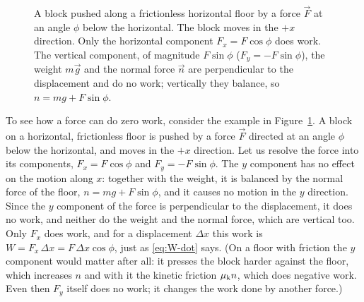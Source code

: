 \documentclass[11pt,a4paper]{article}
\begin{document}
\begin{figure}[ht]
\centering
\begin{minipage}[c]{0.46\textwidth}
\centering
{}
\end{minipage}\hfill
\begin{minipage}[c]{0.5\textwidth}
\caption{A block pushed along a frictionless horizontal floor by a force $\vec{F}$ at an angle $\phi$
below the horizontal. The block moves in the $+x$ direction. Only the horizontal component
$F_x = F\cos\phi$ does work. The vertical component, of magnitude $F\sin\phi$
($F_y = -F\sin\phi$), the weight $m\vec{g}$ and the normal force
$\vec{n}$ are perpendicular to the displacement and do no work; vertically they balance, so
$n = mg + F\sin\phi$.}\label{fig:push}
\end{minipage}
\end{figure}

To see how a force can do zero work, consider the example in Figure~\ref{fig:push}. A block on a
horizontal, frictionless floor is pushed by a force $\vec{F}$ directed at an angle $\phi$ below the
horizontal, and moves in the $+x$ direction. Let us resolve the force into its components,
$F_x = F\cos\phi$ and $F_y = -F\sin\phi$. The $y$ component has no effect on the motion along $x$:
together with the weight, it is balanced by the normal force of the floor, $n = mg + F\sin\phi$, and it
causes no motion in the $y$ direction. Since the $y$ component of the force is perpendicular to the
displacement, it does no work, and neither do the weight and the normal force, which are vertical too.
Only $F_x$ does work, and for a displacement $\Delta x$ this work is $W = F_x\,\Delta x =
F\,\Delta x\cos\phi$, just as \eqref{eq:W-dot} says. (On a floor with friction the $y$ component
would matter after all: it presses the block harder against the floor, which increases $n$ and with it
the kinetic friction $\mu_{\mathrm{k}} n$, which does negative work. Even then $F_y$ itself does no work; it
changes the work done by another force.)
\end{document}
